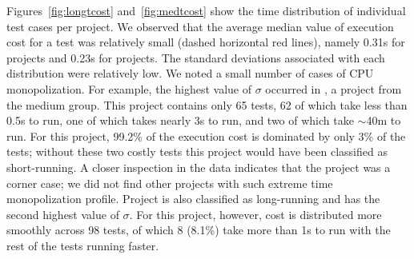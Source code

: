 \sloppy Figures~\ref{fig:longtcost} and~\ref{fig:medtcost} show the
time distribution of individual test cases per project.  We observed
that the average median value of execution cost for a test was
relatively small (dashed horizontal red lines), namely 0.31s for
\medg{} projects and 0.23s for \longg{} projects.  The standard
deviations associated with each distribution were relatively
low.  We noted a small number of
cases of CPU monopolization.  For example, the highest value of
$\sigma$ occurred in , a project from the
medium group.  This project contains only 65 tests, 62 of which take
less than 0.5s to run, one of which takes nearly 3s to run, and two of
which take $\sim$40m to run.  For this project, 99.2\% of the
execution cost is dominated by only 3\% of the tests; without these
two costly tests this project would have been classified as
short-running.  A closer inspection in the data indicates that the
project  was a corner case; we did not find
other projects with such extreme time monopolization profile.  Project
 is also classified as long-running
and has the second highest value of $\sigma$.  For this project,
however, cost is distributed more smoothly across 98 tests, of
which 8 (8.1\%) take more than 1s to run with the rest of
the tests running faster.

